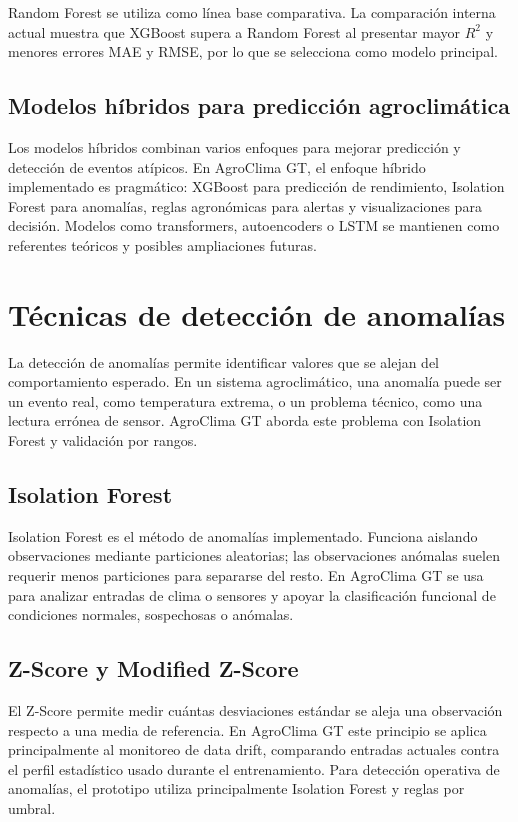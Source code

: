 \documentclass[12pt,letterpaper,oneside]{report}
\begin{document}
Random Forest se utiliza como línea base comparativa. La comparación interna actual muestra que XGBoost supera a Random Forest al presentar mayor $R^2$ y menores errores MAE y RMSE, por lo que se selecciona como modelo principal.

\subsection{Modelos híbridos para predicción agroclimática}
Los modelos híbridos combinan varios enfoques para mejorar predicción y detección de eventos atípicos. En AgroClima GT, el enfoque híbrido implementado es pragmático: XGBoost para predicción de rendimiento, Isolation Forest para anomalías, reglas agronómicas para alertas y visualizaciones para decisión. Modelos como transformers, autoencoders o LSTM se mantienen como referentes teóricos y posibles ampliaciones futuras.

\section{Técnicas de detección de anomalías}
La detección de anomalías permite identificar valores que se alejan del comportamiento esperado. En un sistema agroclimático, una anomalía puede ser un evento real, como temperatura extrema, o un problema técnico, como una lectura errónea de sensor. AgroClima GT aborda este problema con Isolation Forest y validación por rangos.

\subsection{Isolation Forest}
Isolation Forest es el método de anomalías implementado. Funciona aislando observaciones mediante particiones aleatorias; las observaciones anómalas suelen requerir menos particiones para separarse del resto. En AgroClima GT se usa para analizar entradas de clima o sensores y apoyar la clasificación funcional de condiciones normales, sospechosas o anómalas.

\subsection{Z-Score y Modified Z-Score}
El Z-Score permite medir cuántas desviaciones estándar se aleja una observación respecto a una media de referencia. En AgroClima GT este principio se aplica principalmente al monitoreo de data drift, comparando entradas actuales contra el perfil estadístico usado durante el entrenamiento. Para detección operativa de anomalías, el prototipo utiliza principalmente Isolation Forest y reglas por umbral.
\end{document}
